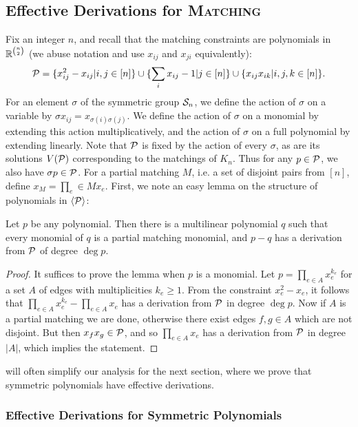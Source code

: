 \subsection{Effective Derivations for \textsc{Matching}}
Fix an integer $n$, and recall that the matching constraints are polynomials in $\mathbb R^{\binom{n}{2}}$ (we abuse notation and use $x_{ij}$ and $x_{ji}$ equivalently):
\[\mathcal P = \{x_{ij}^2 - x_{ij} | i,j \in [n]\} \cup \{\sum_i x_{ij} - 1 | j \in [n]\} \cup \{x_{ij}x_{ik} | i,j,k \in [n]\}.\]
For an element $\sigma$ of the symmetric group $\mathcal S_n$, we define the action of $\sigma$ on a variable by $\sigma x_{ij} = x_{\sigma(i)\sigma(j)}$.
We define the action of $\sigma$ on a monomial by extending this action multiplicatively, and the action of $\sigma$ on a full polynomial by extending linearly.
Note that $\mathcal P$ is fixed by the action of every $\sigma$, as are its solutions $V(\mathcal P)$ corresponding to the matchings of $K_n$. 
Thus for any $p \in \mathcal P$, we also have $\sigma p \in \mathcal P$. For a partial matching $M$, i.e. a set of disjoint pairs from $[n]$, define $x_M = \prod_e \in M x_e$.
First, we note an easy lemma on the structure of polynomials in $\langle \mathcal P \rangle$:
\begin{lemma}\label{lem:monomials}
  Let $p$ be any polynomial. Then there is a multilinear polynomial $q$ such that every monomial of $q$ is a partial matching monomial, and $p-q$ has a derivation from $\mathcal P$ of degree $\deg p$.
\end{lemma}
\begin{proof}
It suffices to prove the lemma when \(p\) is a monomial. Let
\(p = \prod_{e \in A} x_{e}^{k_{e}}\)
for a set \(A\) of edges with multiplicities \(k_{e} \geq 1\).
From the constraint \(x_{e}^{2} - x_e\), it follows that
$\prod_{e \in A} x_e^{k_e} - \prod_{e \in A} x_e$ has a derivation from $\mathcal P$ in degree $\deg p$.
Now if $A$ is a partial matching we are done, otherwise there exist edges $f,g \in A$ which are not disjoint.
But then $x_fx_g \in \mathcal P$, and so $\prod_{e \in A} x_e$ has a derivation from $\mathcal P$ in degree $|A|$, which implies the statement.
\end{proof}
 will often simplify our analysis for the next section, where we prove that symmetric polynomials have effective derivations.

\subsubsection{Effective Derivations for Symmetric Polynomials}

